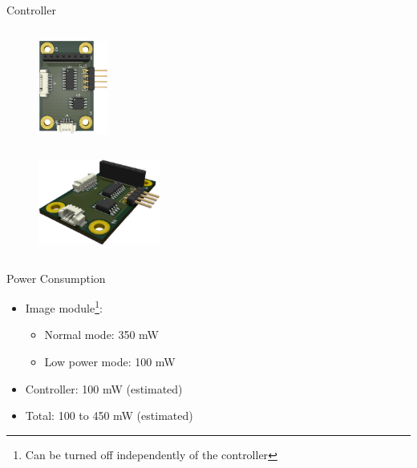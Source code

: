 \begin{frame}{Controller}
\begin{columns}[t]
\begin{column}[t]{0.6\textwidth}
\begin{columns}[t]
                \begin{column}[t]{0.3\textwidth}
                    \begin{figure}[!ht]
                        \begin{center}
                            \includegraphics[height=3.07cm]{figures/slcam-top}
                        \end{center}
                    \end{figure}        
                \end{column}
            \end{columns}
            \begin{figure}[!ht]
                \begin{center}
                    \includegraphics[width=4cm]{figures/slcam}
                \end{center}
            \end{figure}
        \end{column}
    \end{columns}

\end{frame}


\begin{frame}{Power Consumption}

    \begin{itemize}
        \item Image module\footnote{Can be turned off independently of the controller}:
            \begin{itemize}
                \item Normal mode: 350 mW
                \vspace{0.2cm}
                \item Low power mode: 100 mW
            \end{itemize}
        \vspace{0.3cm}
        \item Controller: 100 mW (estimated)
        \vspace{0.3cm}
        \item Total: 100 to 450 mW (estimated)
    \end{itemize}

\end{frame}

